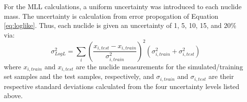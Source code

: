 For the \gls{MLL} calculations, a uniform uncertainty was introduced to each
nuclide mass.  The uncertainty is calculation from error propogation of
Equation \ref{eq:loglike}.  Thus, each nuclide is given an uncertainty of 1, 5,
10, 15, and 20\% via:
\begin{equation}
  \sigma_{Log L}^2 = \sum_i \left( 
                            \frac{x_{i,test} - x_{i,train}}{\sigma_{i,train}^2}
                            \right)^2 
                            (\sigma_{i,train}^2 + \sigma_{i,test}^2)
  \label{eq:mllunc}
\end{equation}
where $x_{i,train}$ and $x_{i,test}$ are the nuclide measurements for the
simulated/training set samples and the test samples, respectively, and
$\sigma_{i,train}$ and $\sigma_{i,test}$ are their respective standard
deviations calculated from the four uncertainty levels listed above.  

